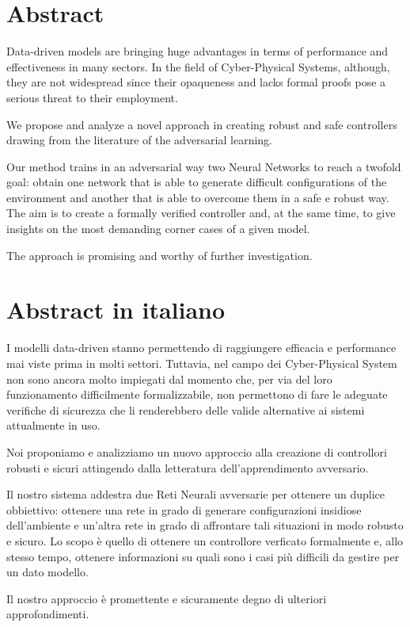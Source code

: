 \chapter*{Abstract}

Data-driven models are bringing huge advantages in terms of performance and effectiveness in many sectors.
In the field of Cyber-Physical Systems, although, they are not widespread since their opaqueness and lacks formal proofs pose a serious threat to their employment.

We propose and analyze a novel approach in creating robust and safe controllers drawing from the literature of the adversarial learning.

Our method trains in an adversarial way two Neural Networks to reach a twofold goal:
obtain one network that is able to generate difficult configurations of the environment and another that is able to overcome them in a safe e robust way.
The aim is to create a formally verified controller and, at the same time, to give insights on the most demanding corner cases of a given model.

The approach is promising and worthy of further investigation.


\chapter*{Abstract in italiano}

I modelli data-driven stanno permettendo di raggiungere efficacia e performance mai viste prima in molti settori.
Tuttavia, nel campo dei Cyber-Physical System non sono ancora molto impiegati dal momento che, per via del loro funzionamento difficilmente formalizzabile, non permettono di fare le adeguate verifiche di sicurezza che li renderebbero delle valide alternative ai sistemi attualmente in uso.

Noi proponiamo e analizziamo un nuovo approccio alla creazione di controllori robusti e sicuri attingendo dalla letteratura dell'apprendimento avversario.

Il nostro sistema addestra due Reti Neurali avversarie per ottenere un duplice obbiettivo: ottenere una rete in grado di generare configurazioni insidiose dell'ambiente e un'altra rete in grado di affrontare tali situazioni in modo robusto e sicuro.
Lo scopo è quello di ottenere un controllore verficato formalmente e, allo stesso tempo, ottenere informazioni su quali sono i casi più difficili da gestire per un dato modello.

Il nostro approccio è promettente e sicuramente degno di ulteriori approfondimenti.